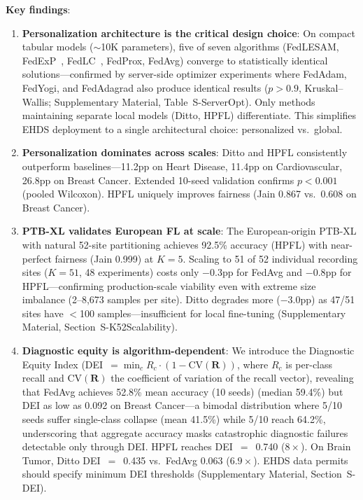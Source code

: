 \documentclass[conference]{IEEEtran}
\begin{document}
\textbf{Key findings}:

\begin{enumerate}
    \item \textbf{Personalization architecture is the critical design choice}: On compact tabular models ($\sim$10K parameters), five of seven algorithms (FedLESAM, FedExP~\cite{jhunjhunwala2023fedexp}, FedLC~\cite{zhang2022fedlc}, FedProx, FedAvg) converge to statistically identical solutions---confirmed by server-side optimizer experiments where FedAdam, FedYogi, and FedAdagrad also produce identical results ($p{>}0.9$, Kruskal--Wallis; Supplementary Material, Table~S-ServerOpt). Only methods maintaining separate local models (Ditto, HPFL) differentiate. This simplifies EHDS deployment to a single architectural choice: personalized vs.\ global.

    \item \textbf{Personalization dominates across scales}: Ditto and HPFL consistently outperform baselines---11.2pp on Heart Disease, 11.4pp on Cardiovascular, 26.8pp on Breast Cancer. Extended 10-seed validation confirms $p < 0.001$ (pooled Wilcoxon). HPFL uniquely improves fairness (Jain 0.867 vs.\ 0.608 on Breast Cancer).

    \item \textbf{PTB-XL validates European FL at scale}: The European-origin PTB-XL with natural 52-site partitioning achieves 92.5\% accuracy (HPFL) with near-perfect fairness (Jain 0.999) at $K{=}5$. Scaling to 51 of 52 individual recording sites ($K{=}51$, 48 experiments) costs only $-$0.3pp for FedAvg and $-$0.8pp for HPFL---confirming production-scale viability even with extreme size imbalance (2--8,673 samples per site). Ditto degrades more ($-$3.0pp) as 47/51 sites have $<$100 samples---insufficient for local fine-tuning (Supplementary Material, Section~S-K52Scalability).

    \item \textbf{Diagnostic equity is algorithm-dependent}: We introduce the Diagnostic Equity Index (DEI~$= \min_c R_c \cdot (1 - \text{CV}(\mathbf{R}))$, where $R_c$ is per-class recall and $\text{CV}(\mathbf{R})$ the coefficient of variation of the recall vector), revealing that FedAvg achieves 52.8\% mean accuracy (10 seeds) (median 59.4\%) but DEI as low as 0.092 on Breast Cancer---a bimodal distribution where 5/10 seeds suffer single-class collapse (mean 41.5\%) while 5/10 reach 64.2\%, underscoring that aggregate accuracy masks catastrophic diagnostic failures detectable only through DEI. HPFL reaches DEI~$=$~0.740 ($8\times$). On Brain Tumor, Ditto DEI~$=$~0.435 vs.\ FedAvg 0.063 ($6.9\times$). EHDS data permits should specify minimum DEI thresholds (Supplementary Material, Section~S-DEI).


\end{enumerate}
\end{document}
